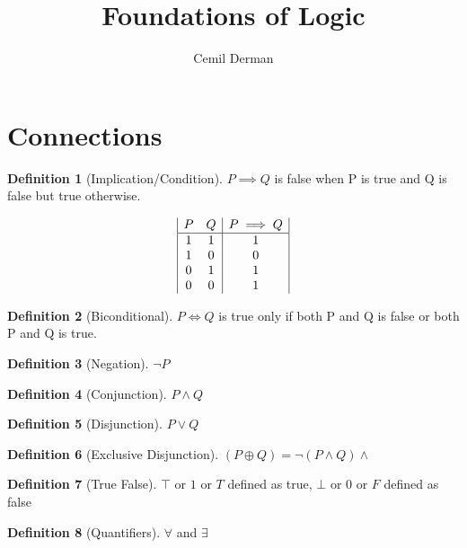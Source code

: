 \documentclass{article}
\title{Foundations of Logic}
\author{Cemil Derman}
\theoremstyle{definition}
\newtheorem{definition}{Definition}[section]
\begin{document}
    \maketitle
    \section{Connections}
    \begin{definition}[Implication/Condition]
      $P \implies Q$  is false when P is true and Q is false but true otherwise.

        \begin{displaymath}
       \begin{array}{|c c|c|}
         P & Q & P \implies Q \\
         \hline
        1 & 1 & 1 \\ 
        1 & 0 & 0 \\ %
        0 & 1 & 1 \\ 
        0 & 0 & 1 
         
       \end{array}
     \end{displaymath}


    \end{definition}
    \begin{definition}[Biconditional]
      $P \iff{Q}$ is true only if both P and Q is false or both P and Q is true.
    
    \end{definition}
    
    \begin{definition}[Negation]
      $\neg P$
    \end{definition}

    \begin{definition}[Conjunction]
   $P \wedge Q$
      
    \end{definition}


    \begin{definition}[Disjunction]
      $P \lor Q$
      
    \end{definition}

    \begin{definition}[Exclusive Disjunction]
      $(P \oplus Q) = \neg(P \wedge Q) \wedge $ %

    \end{definition}

    \begin{definition}[True False]
      $\top$ or $1$ or $T$ defined as true, 
      $\bot$ or $0$ or $F$ defined as false
      
    \end{definition}
  
    \begin{definition}[Quantifiers]
      $\forall$ and $\exists$ 
      
    \end{definition}
\end{document}
